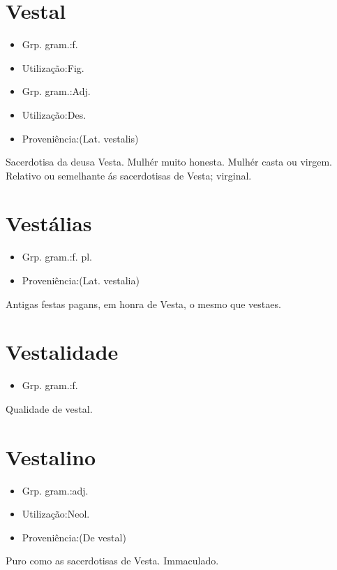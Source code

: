 \documentclass{article}
\begin{document}
\section{Vestal}
\begin{itemize}
\item {Grp. gram.:f.}
\end{itemize}
\begin{itemize}
\item {Utilização:Fig.}
\end{itemize}
\begin{itemize}
\item {Grp. gram.:Adj.}
\end{itemize}
\begin{itemize}
\item {Utilização:Des.}
\end{itemize}
\begin{itemize}
\item {Proveniência:(Lat. \textunderscore vestalis\textunderscore )}
\end{itemize}
Sacerdotisa da deusa Vesta.
Mulhér muito honesta.
Mulhér casta ou virgem.
Relativo ou semelhante ás sacerdotisas de Vesta; virginal.
\section{Vestálias}
\begin{itemize}
\item {Grp. gram.:f. pl.}
\end{itemize}
\begin{itemize}
\item {Proveniência:(Lat. \textunderscore vestalia\textunderscore )}
\end{itemize}
Antigas festas pagans, em honra de Vesta, o mesmo que \textunderscore vestaes\textunderscore .
\section{Vestalidade}
\begin{itemize}
\item {Grp. gram.:f.}
\end{itemize}
Qualidade de vestal.
\section{Vestalino}
\begin{itemize}
\item {Grp. gram.:adj.}
\end{itemize}
\begin{itemize}
\item {Utilização:Neol.}
\end{itemize}
\begin{itemize}
\item {Proveniência:(De \textunderscore vestal\textunderscore )}
\end{itemize}
Puro como as sacerdotisas de Vesta.
Immaculado.
\end{document}
